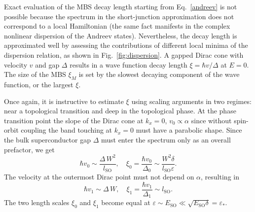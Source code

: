 Exact evaluation of the MBS decay length starting from Eq.~\eqref{andreev} is not possible because the spectrum in the short-junction approximation does not correspond to a local Hamiltonian (the same fact manifests in the complex nonlinear dispersion of the Andreev states).
Nevertheless, the decay length is approximated well by assessing the contributions of different local minima of the dispersion relation, as shown in Fig.~\ref{fig:dispersion}.
A gapped Dirac cone with velocity $v$ and gap $\Delta$ results in a wave function decay length $\xi = \hbar v/\Delta$ at $E=0$.
The size of the MBS $\xi_M$ is set by the slowest decaying component of the wave function, or the largest $\xi$.

Once again, it is instructive to estimate $\xi$ using scaling arguments in two regimes: near a topological transition and deep in the topological phase.
At the phase transition point the slope of the Dirac cone at $k_x=0$, $v_0 \propto \alpha$ since without spin-orbit coupling the band touching at $k_x = 0$ must have a parabolic shape.
Since the bulk superconductor gap $\Delta$ must enter the spectrum only as an overall prefactor, we get
\begin{equation}\label{eq:v_k_0}
\hbar v_0 \sim \frac{\Delta\, W^2}{ l_\textrm{SO}},
\quad \xi_0 = \frac{\hbar v_0}{\Delta_0} \sim \frac{W^2 \delta}{l_\textrm{SO}\varepsilon}.
\end{equation}
The velocity at the outermost Dirac point must not depend on $\alpha$, resulting in
\begin{equation}\label{eq:v_k_f}
\hbar v_1 \sim \Delta\, W,
\quad \xi_1 = \frac{\hbar v_1}{\Delta_1} \sim l_\textrm{SO}.
\end{equation}
The two length scales $\xi_0$ and $\xi_1$ become equal at $\varepsilon \sim E_\textrm{SO} \ll \sqrt{E_\textrm{SO} \delta} = \varepsilon_*$.

